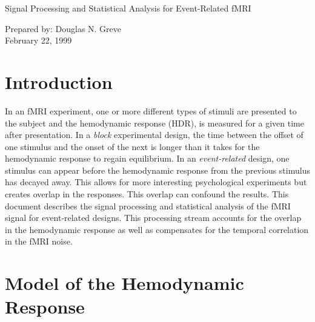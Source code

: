\documentclass[12pt]{article}
\begin{document}
\begin{center}
\begin{Large}
Signal Processing and Statistical Analysis for Event-Related fMRI
\end{Large}
\begin{large}
Prepared by: Douglas N. Greve\\
February 22, 1999
\end{large}
\end{center}

\section{Introduction}

In an fMRI experiment, one or more different types of stimuli are
presented to the subject and the hemodynamic response (HDR), is
measured for a given time after presentation.  In a {\em block}
experimental design, the time between the offset of one stimulus and
the onset of the next is longer than it takes for the hemodynamic
response to regain equilibrium.  In an {\em event-related} design, one
stimulus can appear before the hemodynamic response from the previous
stimulus has decayed away.  This allows for more interesting
psychological experiments but creates overlap in the responses.  This
overlap can confound the results.  This document describes the signal
processing and statistical analysis of the fMRI signal for
event-related designs. This processing stream accounts for the overlap
in the hemodynamic response as well as compensates for the temporal
correlation in the fMRI noise.

\section{Model of the Hemodynamic Response}
\end{document}
